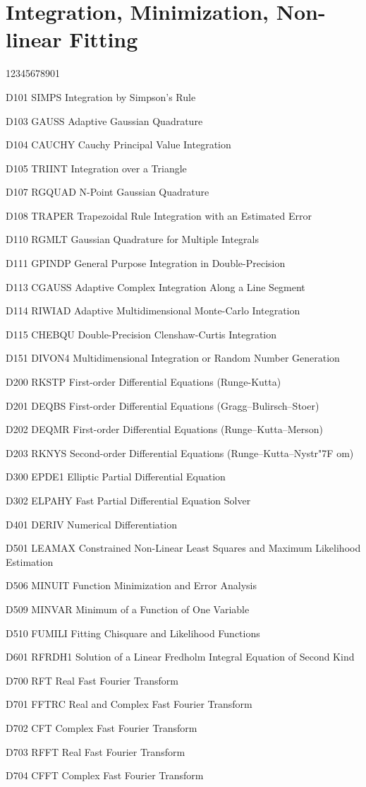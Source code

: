 \section*{Integration, Minimization, Non-linear Fitting}
\begin{DLtt}{12345678901}
\item[D101 SIMPS] Integration by Simpson's Rule
\item[D103 GAUSS] Adaptive Gaussian Quadrature
\item[D104 CAUCHY] Cauchy Principal Value Integration
\item[D105 TRIINT] Integration over a Triangle
\item[D107 RGQUAD] N-Point Gaussian Quadrature
\item[D108 TRAPER] Trapezoidal Rule Integration with an Estimated Error
\item[D110 RGMLT] Gaussian Quadrature for Multiple Integrals
\item[D111 GPINDP] General Purpose Integration in Double-Precision
\item[D113 CGAUSS] Adaptive Complex Integration Along a Line Segment
\item[D114 RIWIAD] Adaptive Multidimensional Monte-Carlo Integration 
\item[D115 CHEBQU] Double-Precision Clenshaw-Curtis Integration
\item[D151 DIVON4] Multidimensional Integration or Random Number Generation
\item[D200 RKSTP] First-order Differential Equations (Runge-Kutta)
\item[D201 DEQBS] First-order Differential Equations (Gragg--Bulirsch--Stoer)
\item[D202 DEQMR] First-order Differential Equations (Runge--Kutta--Merson)
\item[D203 RKNYS] Second-order Differential Equations (Runge--Kutta--Nystr{\accent "7F o}m)
\item[D300 EPDE1] Elliptic Partial Differential Equation
\item[D302 ELPAHY] Fast Partial Differential Equation Solver
\item[D401 DERIV] Numerical Differentiation
\item[D501 LEAMAX] Constrained Non-Linear Least Squares and Maximum
                   Likelihood Estimation
\item[D506 MINUIT] Function Minimization and Error Analysis
\item[D509 MINVAR] Minimum of a Function of One Variable
\item[D510 FUMILI] Fitting Chisquare and Likelihood Functions
\item[D601 RFRDH1] Solution of a Linear Fredholm Integral Equation of Second Kind
\item[D700 RFT] Real Fast Fourier Transform
\item[D701 FFTRC] Real and Complex Fast Fourier Transform
\item[D702 CFT] Complex Fast Fourier Transform
\item[D703 RFFT] Real Fast Fourier Transform
\item[D704 CFFT] Complex Fast Fourier Transform
\end{DLtt}
